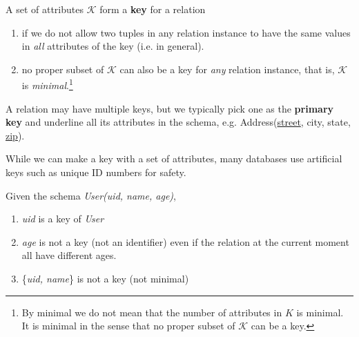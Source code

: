 \documentclass{article}
\begin{document}
    \begin{definition}[Key]
      A set of attributes $\mathcal{K}$ form a \textbf{key} for a relation 
      \begin{enumerate}
        \item if we do not allow two tuples in any relation instance to have the same values in \textit{all} attributes of the key (i.e. in general). 
        \item no proper subset of $\mathcal{K}$ can also be a key for \textit{any} relation instance, that is, $\mathcal{K}$ is \textit{minimal}.\footnote{By minimal we do not mean that the number of attributes in $K$ is minimal. It is minimal in the sense that no proper subset of $\mathcal{K}$ can be a key.}
      \end{enumerate}
      A relation may have multiple keys, but we typically pick one as the \textbf{primary key} and underline all its attributes in the schema, e.g. Address(\underline{street}, city, state, \underline{zip}). 
    \end{definition}

    While we can make a key with a set of attributes, many databases use artificial keys such as unique ID numbers for safety. 

    \begin{example}
      Given the schema \textit{User(uid, name, age)}, 
      \begin{enumerate}
        \item \textit{uid} is a key of \textit{User} 
        \item \textit{age} is not a key (not an identifier) even if the relation at the current moment all have different ages. 
        \item \{\textit{uid, name}\} is not a key (not minimal)
      \end{enumerate}
    \end{example}
\end{document}
